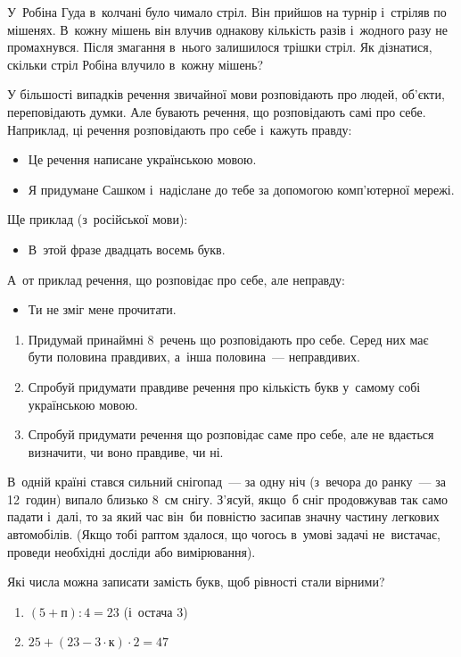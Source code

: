\problem
У~Робіна Гуда в~колчані було чимало стріл.
Він прийшов на турнір і~стріляв по мішенях.
В~кожну мішень він влучив однакову кількість разів
і~жодного разу не промахнувся.
Після змагання в~нього залишилося трішки стріл.
Як дізнатися, скільки стріл Робіна влучило в~кожну мішень?


\problem
У більшості випадків речення звичайної мови розповідають про людей, об'єкти,
переповідають думки.
Але бувають речення, що розповідають самі про себе.
Наприклад, ці речення розповідають про себе і~кажуть правду:
\begin{itemize}
    \item Це речення написане українською мовою.
    \item Я придумане Сашком і~надіслане до тебе
    за допомогою комп’ютерної мережі.
\end{itemize}
Ще приклад (з~російської мови):
\begin{itemize}
    \item В~этой фразе двадцать восемь букв.
\end{itemize}
А~от приклад речення, що розповідає про себе, але неправду:
\begin{itemize}
    \item Ти не зміг мене прочитати.
\end{itemize}

\begin{enumerate}
    \item Придумай принаймні 8~речень що розповідають про себе.
    Серед них має бути половина правдивих, а~інша половина~--- неправдивих.
    \item Спробуй придумати правдиве речення про кількість букв
    у~самому собі українською мовою.
    \item Спробуй придумати речення що розповідає саме про себе,
    але не вдається визначити, чи воно правдиве, чи ні.
\end{enumerate}


\problem
В~одній країні стався сильний снігопад~--- за одну ніч
(з~вечора до ранку~--- за 12~годин) випало близько 8~см снігу.
З'ясуй, якщо~б сніг продовжував так само падати і~далі,
то за який час він~би повністю засипав значну частину легкових автомобілів.
(Якщо тобі раптом здалося, що чогось в~умові задачі не~вистачає,
проведи необхідні досліди або вимірювання).


\problem
Які числа можна записати замість букв, щоб рівності стали вірними?
\begin{enumerate}
    \item $(5 + \textit{п}) : 4 = 23$ (і~остача 3)
    \item $25 + (23 - 3 \cdot \textit{к}) \cdot 2 = 47$
\end{enumerate}


